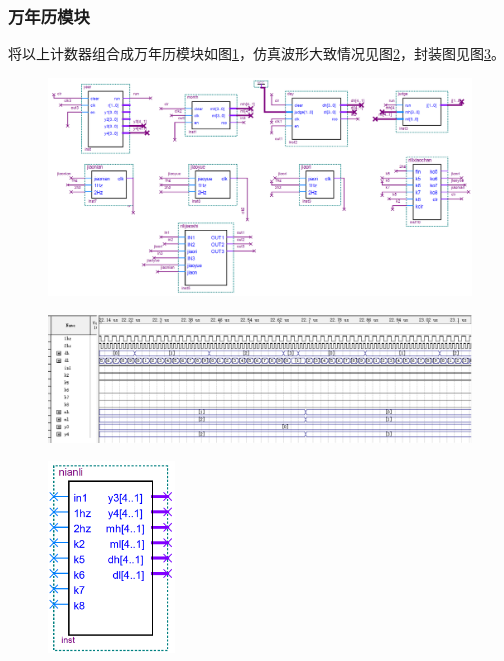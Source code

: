 \documentclass[12pt]{article}
\begin{document}
\subsubsection{万年历模块}
将以上计数器组合成万年历模块如图\ref{fig:nianli}，仿真波形大致情况见图\ref{fig:fangzhennianli}，封装图见图\ref{fig:fengzhuangnianli}。
\begin{figure}[hp]
	\centering  
	\includegraphics[width=\textwidth]{picture/nianli.png} 
	\caption{}
	\label{fig:nianli}   
\end{figure}
\begin{figure}[hp]
	\centering  
	\includegraphics[width=\textwidth]{picture/fznianli.png} 
	\caption{}
	\label{fig:fangzhennianli}   
\end{figure}
\begin{figure}[hp]
	\centering  
	\includegraphics[width=0.3\textwidth]{picture/nianlifz.png} 
	\caption{}
	\label{fig:fengzhuangnianli}   
\end{figure}
\end{document}

